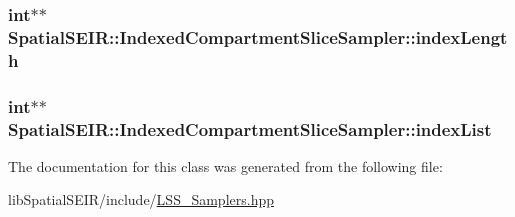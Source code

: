 \hypertarget{classSpatialSEIR_1_1IndexedCompartmentSliceSampler_ada391aecf581b46873e89a3c6c600859}{
\subsubsection[{index\-Length}]{\setlength{\rightskip}{0pt plus 5cm}int$\ast$$\ast$ Spatial\-S\-E\-I\-R\-::\-Indexed\-Compartment\-Slice\-Sampler\-::index\-Length}}\label{classSpatialSEIR_1_1IndexedCompartmentSliceSampler_ada391aecf581b46873e89a3c6c600859}
\hypertarget{classSpatialSEIR_1_1IndexedCompartmentSliceSampler_ad52c949b38fc58f6f734aeb589655c20}{
\subsubsection[{index\-List}]{\setlength{\rightskip}{0pt plus 5cm}int$\ast$$\ast$ Spatial\-S\-E\-I\-R\-::\-Indexed\-Compartment\-Slice\-Sampler\-::index\-List}}\label{classSpatialSEIR_1_1IndexedCompartmentSliceSampler_ad52c949b38fc58f6f734aeb589655c20}


The documentation for this class was generated from the following file\-:\begin{DoxyCompactItemize}
\item 
lib\-Spatial\-S\-E\-I\-R/include/\hyperlink{LSS__Samplers_8hpp}{L\-S\-S\-\_\-\-Samplers.\-hpp}\end{DoxyCompactItemize}
